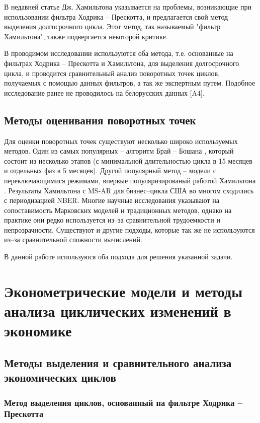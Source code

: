 \documentclass[a4paper,14pt]{extreport}
\begin{document}
	В недавней статье Дж. Хамильтона \cite{hamHP} указывается на проблемы, возникающие при использовании фильтра Ходрика – Прескотта, и предлагается свой метод выделения долгосрочного цикла. Этот метод, так называемый "фильтр Хамильтона", также подвергается некоторой критике.
	
	В проводимом исследовании используются оба метода, т.е. основанные на фильтрах Ходрика – Прескотта и Хамильтона, для выделения долгосрочного цикла, и проводится сравнительный анализ поворотных точек циклов, получаемых с помощью данных фильтров, а так же экспертным путем. Подобное исследование ранее не проводилось на белорусских данных [A4]. \iffalse \cite{makarevich_bsu_conf_2017}.\fi
	
	
	\section{Методы оценивания поворотных точек}
	
	Для оценки поворотных точек существуют несколько широко используемых методов. Один из самых популярных – алгоритм Брай – Бошана \cite{bryCyclicalAnalysis}, который состоит из несколько этапов (с минимальной длительностью цикла в 15 месяцев и отдельных фаз в 5 месяцев). Другой популярный метод – модели с переключающимися режимами, впервые популяризированый работой Хамильтона \cite{hamNewApproach}. Результаты Хамильтона с MS-AR для бизнес–цикла США во многом сходились с периодизацией NBER. Многие научные исследования \cite{bodmanCanada,brunoItaly,hardingTwoMethods} указывают на сопоставимость Марковских моделей и традиционных методов, однако на практике они редко используется из–за сравнительной трудоемкости и непрозрачности. Существуют и другие подходы, которые так же не используются из–за сравнительной сложности вычислений.
	
	В данной работе используюся оба подхода для решения указанной задачи.
	
	
	
	\chapter{Эконометрические модели и методы анализа циклических изменений в экономике}
	
	
	\section{Методы выделения и сравнительного анализа экономических циклов}
	
	\subsection{Метод выделения циклов, основанный на фильтре Ходрика – Прескотта}
	
\end{document}

